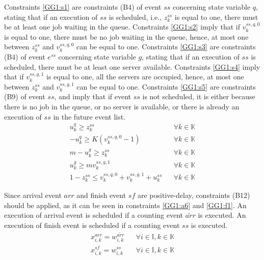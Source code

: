 \documentclass[]{interact}
\theoremstyle{plain}%
\theoremstyle{definition}
\theoremstyle{remark}
\begin{document}
Constraints \eqref{GG1:s1} are constraints (B4) of event ${ss}$ concerning state variable $q$, stating that if an execution of ${ss}$ is scheduled, i.e., $z^{ss}_{k}$ is equal to one, there must be at least one job waiting in the queue. Constraints \eqref{GG1:s2} imply that if $v^{ss,q,0}_k$ is equal to one, there must be no job waiting in the queue, hence, at most one between $z^{ss}_{k}$ and $v^{ss,q,0}_k$ can be equal to one. Constraints \eqref{GG1:s3} are constraints (B4) of event $e^{ss}$ concerning state variable $g$, stating that if an execution of ${ss}$ is scheduled, there must be at least one server available. Constraints \eqref{GG1:s4} imply that if $v^{ss,g,1}_k$ is equal to one, all the servers are occupied, hence, at most one between $z^{ss}_{k}$ and $v^{ss,g,1}_k$ can be equal to one. Constraints \eqref{GG1:s5} are constraints (B9) of event ${ss}$, and imply that if event ${ss}$ is not scheduled, it is either because there is no job in the queue, or no server is available, or there is already an execution of ${ss}$ in the future event list. 
\begin{eqnarray}
u^q_k \ge z^{ss}_{k}&&\forall k\in \mathbb{K} \label{GG1:s1}\\
- u^q_k \ge K(v^{ss,q,0}_k-1)&&\forall k\in \mathbb{K} \label{GG1:s2}\\
m-u^g_k \ge z^{ss}_{k}&&\forall k\in \mathbb{K} \label{GG1:s3}\\
u^g_k  \ge mv^{ss,g,1}_k&&\forall k\in \mathbb{K} \label{GG1:s4}\\
1-z^{ss}_{k}\le  v^{ss,q,0}_k+v^{ss,g,1}_k +u^{ss}_k&&\forall k\in \mathbb{K}\label{GG1:s5}
\end{eqnarray}

Since arrival event ${arr}$ and finish event ${sf}$ are positive-delay, constraints (B12) should be applied, as it can be seen in constraints \eqref{GG1:a6} and \eqref{GG1:f1}. An execution of arrival event is scheduled if a counting event ${\tilde{arr}}$ is executed. An execution of finish event is scheduled if a counting event ${ss}$ is executed. 
\begin{eqnarray}
x^{arr}_{i,k} = w^{\tilde{arr}}_{i,k} && \forall i\in \mathbb{I},k\in \mathbb{K} \label{GG1:a6}\\
x^{sf}_{i,k} = w^{ss}_{i,k} && \forall i\in \mathbb{I},k\in \mathbb{K} \label{GG1:f1}
\end{eqnarray}
\end{document}
